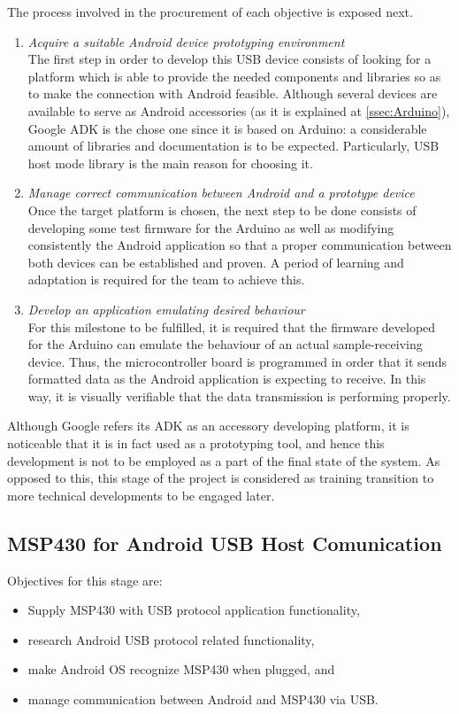 		The process involved in the procurement of each objective is exposed next.

		\begin{enumerate}
			\item \emph{Acquire a suitable Android device prototyping environment}\\
				The first step in order to develop this USB device consists of looking for a platform which
				is able to provide the needed components and libraries so as to make the connection with
				Android feasible. Although several devices are available to serve as Android accessories (as
				it is explained at \autoref{ssec:Arduino}),	Google ADK is the chose one since it is based on
				Arduino: a considerable amount of libraries and documentation is to be expected. Particularly,
				USB host mode library is the main reason for choosing it.

			\item \emph{Manage correct communication between Android and a prototype device}\\
				Once the target platform is chosen, the next step to be done consists of developing some
				test firmware for the Arduino as well as modifying consistently the Android application
				so that a proper communication between both devices can be established and proven. A period 
				of learning and adaptation is required for the team to achieve this.

			\item \emph{Develop an application emulating desired behaviour}\\
				For this milestone to be fulfilled, it is required that the firmware developed for the
				Arduino can emulate the behaviour of an actual sample-receiving device. Thus, the
				microcontroller board is programmed in order that it sends formatted data as the Android
				application is expecting to receive. In this way, it is visually verifiable that the
				data transmission is performing properly.
		\end{enumerate}

		Although Google refers its ADK as an accessory developing platform, it is noticeable that it is
		in fact used as a prototyping tool, and hence this development is not to be employed as a part
		of the final state of the system. As opposed to this, this stage of the project is considered as
		training transition to more technical developments to be engaged later.

	\subsection{MSP430 for Android USB Host Comunication}
	\label{ssec:Android.USB}
		Objectives for this stage are:
		\begin{itemize}
			\item Supply MSP430 with USB protocol application functionality,
			\item research Android USB protocol related functionality,
			\item make Android OS recognize MSP430 when plugged, and
			\item manage communication between Android and MSP430 via USB.
		\end{itemize}

